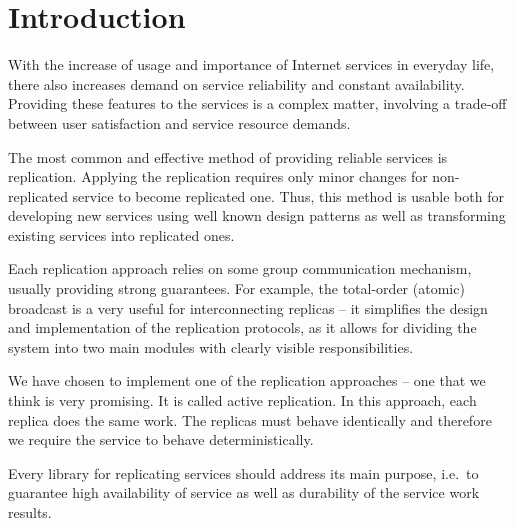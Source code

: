 \chapter{Introduction}

With the increase of usage and importance of Internet services in everyday life, there also increases demand on service reliability and constant availability.
Providing these features to the services is a complex matter, involving a trade-off between user satisfaction and service resource demands.

The most common and effective method of providing reliable services is replication. Applying the replication requires only minor changes for non-replicated service to become replicated one. Thus, this method is usable both for developing new services using well known design patterns as well as transforming existing services into replicated ones.

Each replication approach relies on some group communication mechanism, usually providing strong guarantees. For example, the total-order (atomic) broadcast is a very useful for interconnecting replicas -- it simplifies the design and implementation of the replication protocols, as it allows for dividing the system into two main modules with clearly visible responsibilities.

We have chosen to implement one of the replication approaches -- one that we think is very promising.
It is called active replication. In this approach, each replica does the same work. The replicas must behave identically and therefore we require the service to behave deterministically.

Every library for replicating services should address its main purpose, i.e.\ to guarantee high availability of service as well as durability of the service work results.


%
%
%

